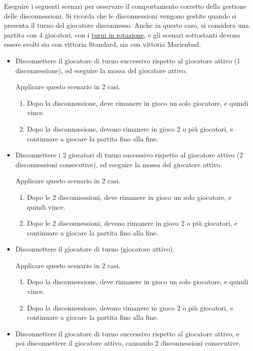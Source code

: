 Eseguire i seguenti scenari per osservare il comportamento corretto della gestione delle disconnessioni. Si ricorda che le disconnessioni vengono gestite quando si presenta il turno del giocatore disconnesso.
\newline
Anche in questo caso, si considera una partita con 4 giocatori, con i \ul{turni in rotazione}, e gli scenari sottostanti devono essere svolti sia con vittoria Standard, sia con vittoria Marienbad.
\begin{itemize}
\item
	Disconnettere il giocatore di turno successivo rispetto al giocatore attivo (1 disconnessione), ed eseguire la mossa del giocatore attivo.
	
	Applicare questo scenario in 2 casi.
	\begin{enumerate}
		\item
		Dopo la disconnessione, deve rimanere in gioco un solo giocatore, e quindi vince.
		\item
		Dopo la disconnessione, devono rimanere in gioco 2 o più giocatori, e continuare a giocare la partita fino alla fine.
	\end{enumerate}
\item
	Disconnettere i 2 giocatori di turno successivo rispetto al giocatore attivo (2 disconnessioni consecutive), ed eseguire la mossa del giocatore attivo.
	
	Applicare questo scenario in 2 casi.
	\begin{enumerate}
		\item
		Dopo le 2 disconnessioni, deve rimanere in gioco un solo giocatore, e quindi vince.
		\item
		Dopo le 2 disconnessioni, devono rimanere in gioco 2 o più giocatori, e continuare a giocare la partita fino alla fine.
	\end{enumerate}
\item
	Disconnettere il giocatore di turno (giocatore attivo).
	
	Applicare questo scenario in 2 casi.
	\begin{enumerate}
		\item
		Dopo la disconnessione, deve rimanere in gioco un solo giocatore, e quindi vince.
		\item
		Dopo la disconnessione, devono rimanere in gioco 2 o più giocatori, e continuare a giocare la partita fino alla fine.
	\end{enumerate}
\item
	Disconnettere il giocatore di turno successivo rispetto al giocatore attivo, e poi disconnettere il giocatore attivo, causando 2 disconnessioni consecutive.
	

\end{itemize}
